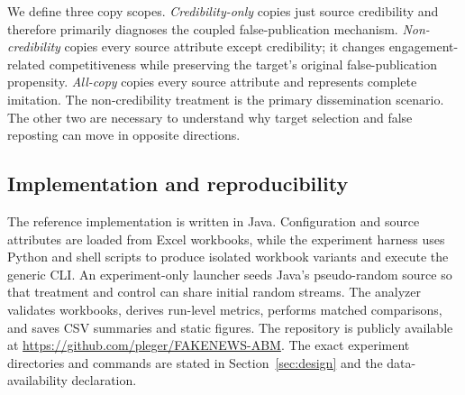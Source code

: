 We define three copy scopes. \emph{Credibility-only} copies just source credibility and therefore primarily diagnoses the coupled false-publication mechanism. \emph{Non-credibility} copies every source attribute except credibility; it changes engagement-related competitiveness while preserving the target's original false-publication propensity. \emph{All-copy} copies every source attribute and represents complete imitation. The non-credibility treatment is the primary dissemination scenario. The other two are necessary to understand why target selection and false reposting can move in opposite directions.

\subsection{Implementation and reproducibility}

The reference implementation is written in Java. Configuration and source attributes are loaded from Excel workbooks, while the experiment harness uses Python and shell scripts to produce isolated workbook variants and execute the generic CLI. An experiment-only launcher seeds Java's pseudo-random source so that treatment and control can share initial random streams. The analyzer validates workbooks, derives run-level metrics, performs matched comparisons, and saves CSV summaries and static figures. The repository is publicly available at \url{https://github.com/pleger/FAKENEWS-ABM}. The exact experiment directories and commands are stated in Section~\ref{sec:design} and the data-availability declaration.

